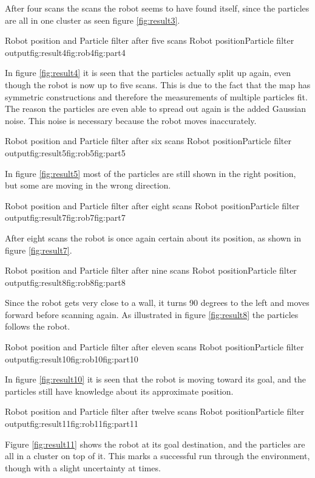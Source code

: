 \FloatBarrier
After four scans the scans the robot seems to have found itself, since the particles are all in one cluster as seen figure \ref{fig:result3}.


{Robot position and Particle filter after five scans}
{Robot position}{Particle filter output}{fig:result4}{fig:rob4}{fig:part4}

\FloatBarrier
In figure \ref{fig:result4} it is seen that the particles actually split up again, even though the robot is now up to five scans. This is due to the fact that the map has symmetric constructions and therefore the measurements of multiple particles fit. The reason the particles are even able to spread out again is the added Gaussian noise. This noise is necessary because the robot moves inaccurately. 


{Robot position and Particle filter after six scans}
{Robot position}{Particle filter output}{fig:result5}{fig:rob5}{fig:part5}

\FloatBarrier
In figure \ref{fig:result5} most of the particles are still shown in the right position, but some are moving in the wrong direction.


{Robot position and Particle filter after eight scans}
{Robot position}{Particle filter output}{fig:result7}{fig:rob7}{fig:part7}

\FloatBarrier
After eight scans the robot is once again certain about its position, as shown in figure \ref{fig:result7}.


{Robot position and Particle filter after nine scans}
{Robot position}{Particle filter output}{fig:result8}{fig:rob8}{fig:part8}

\FloatBarrier
Since the robot gets very close to a wall, it turns 90 degrees to the left and moves forward before scanning again. As illustrated in figure  \ref{fig:result8} the particles follows the robot.


{Robot position and Particle filter after eleven scans}
{Robot position}{Particle filter output}{fig:result10}{fig:rob10}{fig:part10}

\FloatBarrier
In figure \ref{fig:result10} it is seen that the robot is moving toward its goal, and the particles still have knowledge about its approximate position.


{Robot position and Particle filter after twelve scans}
{Robot position}{Particle filter output}{fig:result11}{fig:rob11}{fig:part11}

\FloatBarrier
Figure \ref{fig:result11} shows the robot at its goal destination, and the particles are all in a cluster on top of it. This marks a successful run through the environment, though with a slight uncertainty at times.

 